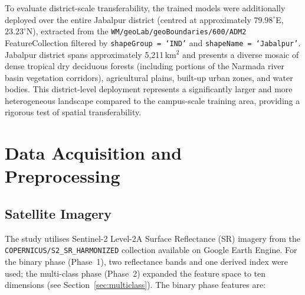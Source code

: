 \documentclass[12pt, a4paper, twocolumn]{article}
\begin{document}
To evaluate district-scale transferability, the trained models were additionally deployed over the entire Jabalpur district (centred at approximately $79.98^{\circ}$E, $23.23^{\circ}$N), extracted from the \texttt{WM/geoLab/geoBoundaries/600/ADM2} FeatureCollection filtered by \texttt{shapeGroup = `IND'} and \texttt{shapeName = `Jabalpur'}.
Jabalpur district spans approximately 5,211\,km$^2$ and presents a diverse mosaic of dense tropical dry deciduous forests (including portions of the Narmada river basin vegetation corridors), agricultural plains, built-up urban zones, and water bodies.
This district-level deployment represents a significantly larger and more heterogeneous landscape compared to the campus-scale training area, providing a rigorous test of spatial transferability.

\section{Data Acquisition and Preprocessing}
\label{sec:data}

\subsection{Satellite Imagery}

The study utilises Sentinel-2 Level-2A Surface Reflectance (SR) imagery from the \texttt{COPERNICUS/S2\_SR\_HARMONIZED} collection available on Google Earth Engine.
For the binary phase (Phase~1), two reflectance bands and one derived index were used;
the multi-class phase (Phase~2) expanded the feature space to ten dimensions (see Section~\ref{sec:multiclass}).
The binary phase features are:

\begin{table}[H]
\centering
\caption{Spectral features used for classification.}
\label{tab:bands}
\end{table}
\end{document}
